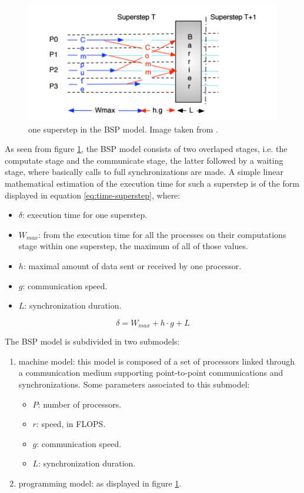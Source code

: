 \documentclass[paper=a4, fontsize=11pt]{scrartcl} %
\numberwithin{equation}{section} %
\numberwithin{figure}{section} %
\numberwithin{table}{section} %
\begin{document}
\begin{figure}
\centering
\includegraphics[width=1\linewidth]{bsp-description.png}
\caption{one superstep in the BSP model. Image taken from \cite{hamidouche}.} \label{fig:bsp-description}
\end{figure}

As seen from figure \ref{fig:bsp-description}, the BSP model consists of two overlaped stages, i.e. the computate stage and the communicate stage, the latter followed by a waiting stage, where basically calls to full synchronizations are made. A simple linear mathematical estimation of the execution time for such a superstep is of the form displayed in equation \ref{eq:time-superstep}, where:

\begin{itemize}
\item $\delta$: execution time for one superstep.
\item $W_{max}$: from the execution time for all the processes on their computations stage within one superstep, the maximum of all of those values.
\item $h$: maximal amount of data sent or received by one processor.
\item $g$: communication speed.
\item $L$: synchronization duration.
\end{itemize}

\begin{equation}
\delta = W_{max} + h\cdot g + L
\label{eq:time-superstep}
\end{equation}

The BSP model is subdivided in two submodels:

\begin{enumerate}
\item machine model: this model is composed of a set of processors linked through a communication medium supporting point-to-point communications and synchronizations. Some parameters associated to this submodel:
\begin{itemize}
\item $P$: number of processors.
\item $r$: speed, in FLOPS.
\item $g$: communication speed.
\item $L$: synchronization duration.
\end{itemize}
\item programming model: as displayed in figure \ref{fig:bsp-description}.
\end{enumerate}
\end{document}
